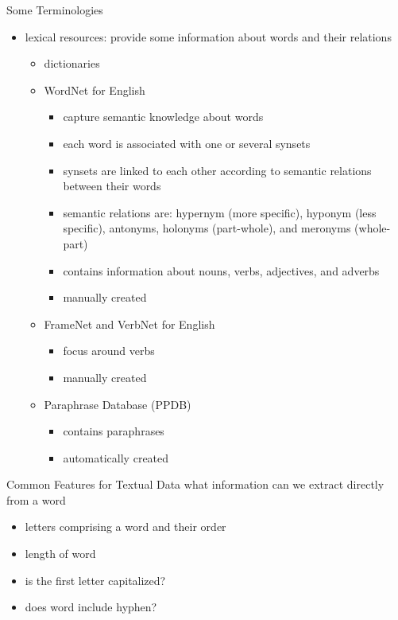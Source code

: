 \begin{frame}{Some Terminologies}
    \begin{itemize}
        \item lexical resources: provide some information about words and their relations
        \begin{itemize}
            \item<1-> dictionaries
            \item<2-> WordNet for English
                \begin{itemize}
                    \item<3-> capture semantic knowledge about words
                    \item<4-> each word is associated with one or several synsets
                    \item<5-> synsets are linked to each other according to semantic relations  between their words
                    \item<6-> semantic relations are: hypernym (more specific),  hyponym (less specific), antonyms, holonyms (part-whole), and meronyms (whole-part) 
                    \item<7-> contains information about nouns, verbs, adjectives, and adverbs
                    \item<8-> manually created
                \end{itemize}
            \item<9-> FrameNet and VerbNet for English
            \begin{itemize}
                \item<10-> focus around verbs
                \item<11-> manually created
            \end{itemize}
            \item<12-> Paraphrase Database (PPDB) 
            \begin{itemize}
                \item<13-> contains paraphrases 
                \item<14-> automatically created
            \end{itemize}
        \end{itemize}
    \end{itemize}
\end{frame}
\begin{frame}{Common Features for Textual Data}
    what information can  we extract directly from  a word 
    \begin{itemize}
        \item<1-> letters comprising a word and their order
        \item<2-> length of word
        \item<3-> is the first letter capitalized?
        \item<4-> does word include hyphen? 

    \end{itemize}
    
\end{frame}
